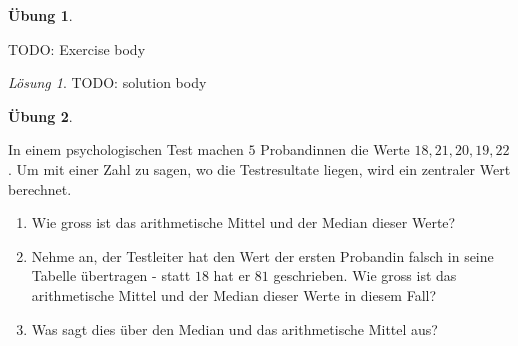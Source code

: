 \documentclass[
]{book}
\providecommand{\tightlist}{%
  \setlength{\itemsep}{0pt}\setlength{\parskip}{0pt}}
\theoremstyle{definition}
\theoremstyle{definition}
\theoremstyle{definition}
\newtheorem{exercise}{Übung}[chapter]
\theoremstyle{definition}
\theoremstyle{remark}
\newtheorem*{solution}{Lösung}
\begin{document}
\begin{exercise}
\protect\hypertarget{exr:temptag_pvai8hwv}{}\label{exr:temptag_pvai8hwv}\leavevmode

TODO: Exercise body

\end{exercise}

\begin{solution}
TODO: solution body
\end{solution}

\begin{exercise}
\protect\hypertarget{exr:theorie-mdn-mean}{}\label{exr:theorie-mdn-mean}\leavevmode

In einem psychologischen Test machen \(5\) Probandinnen die Werte \(18, 21, 20, 19, 22\). Um mit einer Zahl zu sagen, wo die Testresultate liegen, wird ein zentraler Wert berechnet.

\begin{enumerate}
\def\labelenumi{(\alph{enumi})}
\tightlist
\item
  Wie gross ist das arithmetische Mittel und der Median dieser Werte?
\item
  Nehme an, der Testleiter hat den Wert der ersten Probandin falsch in seine Tabelle übertragen - statt \(18\) hat er \(81\) geschrieben. Wie gross ist das arithmetische Mittel und der Median dieser Werte in diesem Fall?
\item
  Was sagt dies über den Median und das arithmetische Mittel aus?
\end{enumerate}

\end{exercise}
\end{document}

